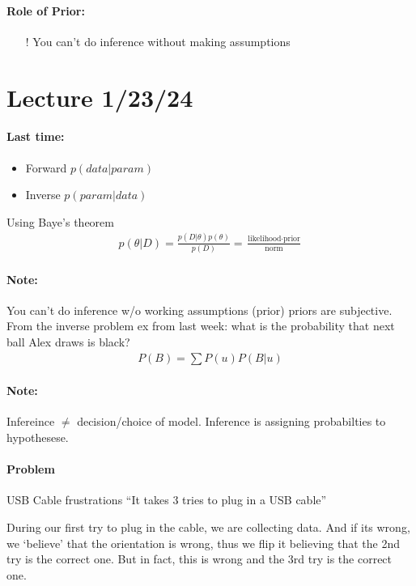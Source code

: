\documentclass[../main.tex]{subfiles}
\begin{document}
\paragraph{Role of Prior:}
\begin{itemize}
    \item[!] You can't do inference without making assumptions
\end{itemize}

\newpage
\section*{Lecture 1/23/24}
\barh \vspace{10px}

\paragraph{Last time: }
\begin{itemize}
    \item Forward $p(data | param)$
    \item Inverse $p(param | data)$
\end{itemize}
Using Baye's theorem
\begin{align*}
    p(\theta|D) = \frac{p(D|\theta) p(\theta)}{p(D)}
    = \frac{\textrm{likelihood} \cdot \textrm{prior}}{\textrm{norm}}
\end{align*}
\paragraph{Note:} You can't do inference w/o working assumptions (prior) priors are subjective. From
the inverse problem ex from last week: what is the probability that next ball Alex draws is black?
\begin{align*}
    P(B) = \sum P(u) P(B|u)
\end{align*}

\paragraph{Note:} Infereince $\neq$ decision/choice of model. Inference is assigning probabilties to
hypothesese. 

\paragraph{Problem } USB Cable frustrations ``It takes 3 tries to plug in a USB cable''

During our first try to plug in the cable, we are collecting data. And if its wrong, we `believe'
that the orientation is wrong, thus we flip it believing that the 2nd try is the correct one. But in
fact, this is wrong and the 3rd try is the correct one. 
\end{document}
